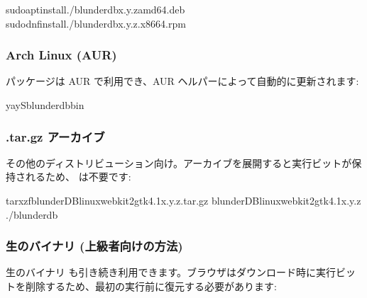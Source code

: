 \documentclass[letterpaper,10pt,dvipdfmx]{sphinxmanual}
\begin{document}
\begin{sphinxVerbatim}[commandchars=\\\{\}]
sudoaptinstall./blunderdb\PYGZus{}x.y.z\PYGZus{}amd64.deb
sudodnfinstall./blunderdb\PYGZhy{}x.y.z.x86\PYGZus{}64.rpm
\end{sphinxVerbatim}


\subsubsection{Arch Linux (AUR)}
\label{\detokenize{telecharge_install:arch-linux-aur}}
\sphinxAtStartPar
{} パッケージは AUR で利用でき、AUR ヘルパーによって自動的に更新されます:

\begin{sphinxVerbatim}[commandchars=\\\{\}]
yay\PYGZhy{}Sblunderdb\PYGZhy{}bin
\end{sphinxVerbatim}


\subsubsection{.tar.gz アーカイブ}
\label{\detokenize{telecharge_install:archive-tar-gz}}
\sphinxAtStartPar
その他のディストリビューション向け。アーカイブを展開すると実行ビットが保持されるため、 は不要です:

\begin{sphinxVerbatim}[commandchars=\\\{\}]
tarxzfblunderDB\PYGZhy{}linux\PYGZhy{}webkit2gtk\PYGZhy{}4.1\PYGZhy{}x.y.z.tar.gz
blunderDB\PYGZhy{}linux\PYGZhy{}webkit2gtk\PYGZhy{}4.1\PYGZhy{}x.y.z
./blunderdb
\end{sphinxVerbatim}


\subsubsection{生のバイナリ (上級者向けの方法)}
\label{\detokenize{telecharge_install:binaire-brut-methode-avancee}}
\sphinxAtStartPar
生のバイナリ  も引き続き利用できます。ブラウザはダウンロード時に実行ビットを削除するため、最初の実行前に復元する必要があります:
\end{document}
